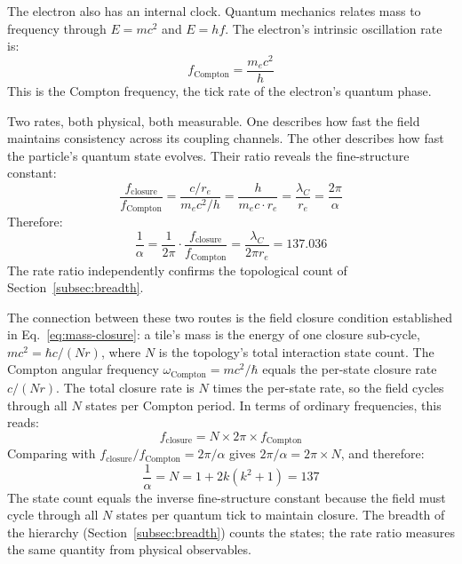 \documentclass[aps,prd,preprint,superscriptaddress,showpacs,preprintnumbers,amsmath,amssymb,nofootinbib]{revtex4-2}
\begin{document}
The electron also has an internal clock. Quantum mechanics relates mass to frequency through $E = mc^2$ and $E = hf$. The electron's intrinsic oscillation rate is:
\begin{equation}
f_{\text{Compton}} = \frac{m_e c^2}{h}
\end{equation}
This is the Compton frequency, the tick rate of the electron's quantum phase.

Two rates, both physical, both measurable. One describes how fast the field maintains consistency across its coupling channels. The other describes how fast the particle's quantum state evolves. Their ratio reveals the fine-structure constant:
\begin{equation}
\frac{f_{\text{closure}}}{f_{\text{Compton}}} = \frac{c/r_e}{m_e c^2/h} = \frac{h}{m_e c \cdot r_e} = \frac{\lambda_C}{r_e} = \frac{2\pi}{\alpha}
\end{equation}
Therefore:
\begin{equation}
\frac{1}{\alpha} = \frac{1}{2\pi} \cdot \frac{f_{\text{closure}}}{f_{\text{Compton}}} = \frac{\lambda_C}{2\pi r_e} = 137.036
\label{eq:alpha-rates}
\end{equation}
The rate ratio independently confirms the topological count of Section~\ref{subsec:breadth}.

The connection between these two routes is the field closure condition established in Eq.~\ref{eq:mass-closure}: a tile's mass is the energy of one closure sub-cycle, $mc^2 = \hbar c/(Nr)$, where $N$ is the topology's total interaction state count. The Compton angular frequency $\omega_{\text{Compton}} = mc^2/\hbar$ equals the per-state closure rate $c/(Nr)$. The total closure rate is $N$ times the per-state rate, so the field cycles through all $N$ states per Compton period. In terms of ordinary frequencies, this reads:
\begin{equation*}
f_{\text{closure}} = N \times 2\pi \times f_{\text{Compton}}
\end{equation*}
Comparing with $f_{\text{closure}}/f_{\text{Compton}} = 2\pi/\alpha$ gives $2\pi/\alpha = 2\pi \times N$, and therefore:
\begin{equation}
\frac{1}{\alpha} = N = 1 + 2k(k^2 + 1) = 137
\label{eq:alpha-integer}
\end{equation}
The state count equals the inverse fine-structure constant because the field must cycle through all $N$ states per quantum tick to maintain closure. The breadth of the hierarchy (Section~\ref{subsec:breadth}) counts the states; the rate ratio measures the same quantity from physical observables.
\end{document}
